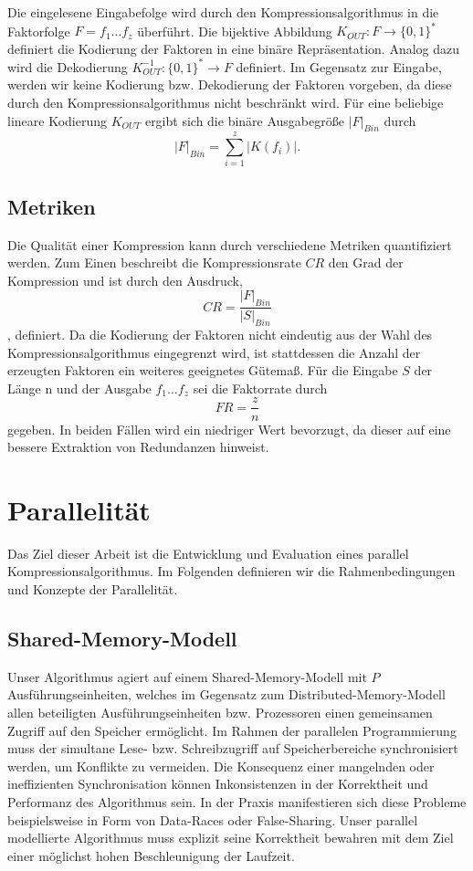 Die eingelesene Eingabefolge wird durch den Kompressionsalgorithmus in die Faktorfolge $F=f_1...f_z$ überführt. Die bijektive Abbildung $K_{OUT}: F \rightarrow \{0,1\}^*$
definiert die Kodierung der Faktoren in eine binäre Repräsentation. Analog dazu wird die Dekodierung $K^{-1}_{OUT}: \{0,1\}^* \rightarrow F$ definiert. Im Gegensatz zur Eingabe, 
werden wir keine Kodierung bzw. Dekodierung der Faktoren vorgeben, da diese durch den Kompressionsalgorithmus nicht beschränkt wird. Für eine beliebige lineare Kodierung $K_{OUT}$ ergibt 
sich die binäre Ausgabegröße $|F|_{Bin}$ durch
\begin{equation}
    |F|_{Bin} = \sum_{i=1}^{z} |K(f_i)|.
\end{equation}

\subsection{Metriken}
Die Qualität einer Kompression kann durch verschiedene Metriken quantifiziert werden. Zum Einen beschreibt die Kompressionsrate $CR$ den Grad der Kompression und ist durch den
Ausdruck, 
\begin{equation}
    CR = \frac{|F|_{Bin}}{|S|_{Bin}}
\end{equation}
, definiert.
Da die Kodierung der Faktoren nicht eindeutig aus der Wahl des Kompressionsalgorithmus eingegrenzt wird, ist stattdessen die Anzahl der erzeugten Faktoren ein
weiteres geeignetes Gütemaß. Für die Eingabe $S$ der Länge n und der Ausgabe $f_1...f_z$ sei die Faktorrate durch
\begin{equation}
    FR = \frac{z}{n}
\end{equation}
gegeben. In beiden Fällen wird ein niedriger Wert bevorzugt, da dieser auf eine bessere Extraktion von Redundanzen hinweist.

\section{Parallelität}
Das Ziel dieser Arbeit ist die Entwicklung und Evaluation eines parallel Kompressionsalgorithmus. Im Folgenden definieren wir die Rahmenbedingungen und Konzepte der Parallelität.

\subsection{Shared-Memory-Modell}
Unser Algorithmus agiert auf einem Shared-Memory-Modell mit $P$ Ausführungseinheiten, welches im Gegensatz zum Distributed-Memory-Modell allen beteiligten 
Ausführungseinheiten bzw. Prozessoren einen gemeinsamen Zugriff auf den Speicher ermöglicht. Im Rahmen der parallelen Programmierung muss der simultane Lese- bzw. Schreibzugriff auf
Speicherbereiche synchronisiert werden, um Konflikte zu vermeiden. Die Konsequenz einer mangelnden oder ineffizienten Synchronisation können Inkonsistenzen in der Korrektheit und
Performanz des Algorithmus sein. In der Praxis manifestieren sich diese Probleme beispielsweise in Form von Data-Races oder False-Sharing.\cite{parallelcomputing}
Unser parallel modellierte Algorithmus muss explizit seine Korrektheit bewahren mit dem Ziel einer möglichst hohen Beschleunigung der Laufzeit.

